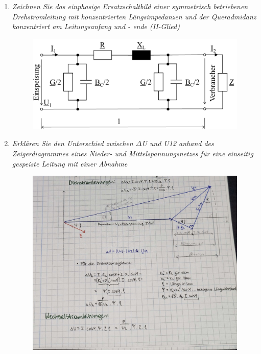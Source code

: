 \documentclass[12pt]{article}
\begin{document}
\begin{enumerate}
    
    \item \textit{Zeichnen Sie das einphasige Ersatzschaltbild einer 
    symmetrisch betriebenen Drehstromleitung mit 
    konzentrierten Längsimpedanzen und der 
    Queradmidanz konzentriert am Leitungsanfang und -
    ende (II-Glied)}\\

    \begin{figure}[h]
        \includegraphics[width=\textwidth]{figures/II-Glied.PNG}
        \centering
    \end{figure}

    \item \textit{Erklären Sie den Unterschied zwischen $\Delta$U und 
    U12 anhand des Zeigerdiagrammes eines Nieder- und Mittelspannungsnetzes für eine einseitig 
    gespeiste Leitung mit einer Abnahme}\\

    \begin{figure}[h]
        \includegraphics[width=\textwidth]{figures/Zeiger.jpg}
        \centering
    \end{figure}



\end{enumerate}
\end{document}
